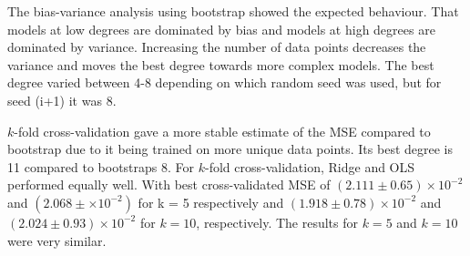 \documentclass[reprint,english,notitlepage]{revtex4-2}  %
\begin{document}
The bias-variance analysis using bootstrap showed the expected behaviour. That models at low degrees are dominated by bias and models at high degrees are dominated by variance. Increasing the number of data points decreases the variance and moves the best degree towards more complex models. The best degree varied between 4-8 depending on which random seed was used, but for seed (i+1) it was 8. 

$k$-fold cross-validation gave a more stable estimate of the MSE compared to bootstrap due to it being trained on more unique data points. Its best degree is 11 compared to bootstraps 8. For $k$-fold cross-validation, Ridge and OLS performed equally well. With best cross-validated MSE of $(2.111 \pm 0.65) \times 10^{-2}$ and $(2.068 \pm \times 10^{-2})$ for k = 5 respectively and $(1.918 \pm 0.78) \times 10^{-2}$ and $(2.024 \pm 0.93) \times 10^{-2}$ for $k = 10$, respectively. The results for $k = 5$ and $k = 10$ were very similar. 
\end{document}
